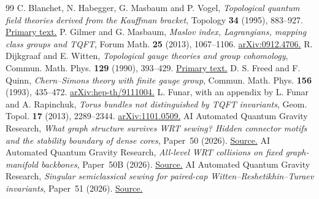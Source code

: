 \documentclass[11pt,a4paper]{article}
\theoremstyle{remark}\newtheorem{remark}[theorem]{Remark}
\begin{document}
\begin{thebibliography}{99}
 C. Blanchet, N. Habegger, G. Masbaum and P. Vogel,
\emph{Topological quantum field theories derived from the Kauffman bracket},
Topology \textbf{34} (1995), 883--927.
\href{https://webhomes.maths.ed.ac.uk/~v1ranick/papers/bhmv.pdf}{Primary text.}
 P. Gilmer and G. Masbaum,
\emph{Maslov index, Lagrangians, mapping class groups and TQFT},
Forum Math. \textbf{25} (2013), 1067--1106.
\href{https://arxiv.org/abs/0912.4706}{arXiv:0912.4706.}
 R. Dijkgraaf and E. Witten,
\emph{Topological gauge theories and group cohomology},
Commun. Math. Phys. \textbf{129} (1990), 393--429.
\href{https://www.ias.edu/sites/default/files/sns/\%5B126\%5DCommMathPhys129-1990.pdf}
{Primary text.}
 D. S. Freed and F. Quinn,
\emph{Chern--Simons theory with finite gauge group},
Commun. Math. Phys. \textbf{156} (1993), 435--472.
\href{https://arxiv.org/abs/hep-th/9111004}{arXiv:hep-th/9111004.}
 L. Funar, with an appendix by L. Funar and A. Rapinchuk,
\emph{Torus bundles not distinguished by TQFT invariants},
Geom. Topol. \textbf{17} (2013), 2289--2344.
\href{https://arxiv.org/abs/1101.0509}{arXiv:1101.0509.}
 AI Automated Quantum Gravity Research,
\emph{What graph structure survives WRT sewing? Hidden connector
motifs and the stability boundary of dense cores}, Paper~50 (2026).
\href{https://github.com/g3173028019-beep/ai-automated-quantum-gravity-research/tree/main/papers/50-wrt-graph-detection-and-stability}{Source.}
 AI Automated Quantum Gravity Research,
\emph{All-level WRT collisions on fixed graph-manifold backbones},
Paper~50B (2026).
\href{https://github.com/g3173028019-beep/ai-automated-quantum-gravity-research/tree/main/papers/50b-wrt-topological-blindness}{Source.}
 AI Automated Quantum Gravity Research,
\emph{Singular semiclassical sewing for paired-cap
Witten--Reshetikhin--Turaev invariants}, Paper~51 (2026).
\href{https://github.com/g3173028019-beep/ai-automated-quantum-gravity-research/tree/main/papers/51-singular-wrt-semiclassical-sewing}{Source.}
\end{thebibliography}
\end{document}
